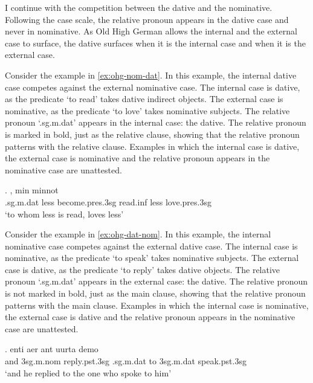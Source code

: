 I continue with the competition between the dative and the nominative. Following the case scale, the relative pronoun appears in the dative case and never in nominative. As Old High German allows the internal and the external case to surface, the dative surfaces when it is the internal case and when it is the external case.

Consider the example in \ref{ex:ohg-nom-dat}. In this example, the internal dative case competes against the external nominative case.
The internal case is dative, as the predicate  `to read' takes dative indirect objects.
The external case is nominative, as the predicate  `to love' takes nominative subjects.
The relative pronoun  `.\ac{sg}.\ac{m}.\ac{dat}' appears in the internal case: the dative. The relative pronoun is marked in bold, just as the relative clause, showing that the relative pronoun patterns with the relative clause.
Examples in which the internal case is dative, the external case is nominative and the relative pronoun appears in the nominative case are unattested.

\exg.    , min minnot\\
.\ac{sg}.\ac{m}.\ac{dat} less become.\ac{pres}.3\ac{sg} read.\ac{inf}\scsub{[dat]} less love.\ac{pres}.3\ac{sg}\scsub{[nom]}\\
`to whom less is read, loves less' \label{ex:ohg-nom-dat}

Consider the example in \ref{ex:ohg-dat-nom}. In this example, the internal nominative case competes against the external dative case.
The internal case is nominative, as the predicate  `to speak' takes nominative subjects.
The external case is dative, as the predicate  `to reply' takes dative objects.
The relative pronoun  `.\ac{sg}.\ac{m}.\ac{dat}' appears in the external case: the dative. The relative pronoun is not marked in bold, just as the main clause, showing that the relative pronoun patterns with the main clause.
Examples in which the internal case is nominative, the external case is dative and the relative pronoun appears in the nominative case are unattested.

\exg. enti aer {ant uurta} demo  \\
and 3\ac{sg}.\ac{m}.\ac{nom} reply.\ac{pst}.3\ac{sg}\scsub{[dat]} .\ac{sg}.\ac{m}.\ac{dat} {to 3\ac{sg}.\ac{m}.\ac{dat}} speak.\ac{pst}.3\ac{sg}\scsub{[nom]}\\
`and he replied to the one who spoke to him' \label{ex:ohg-dat-nom}

